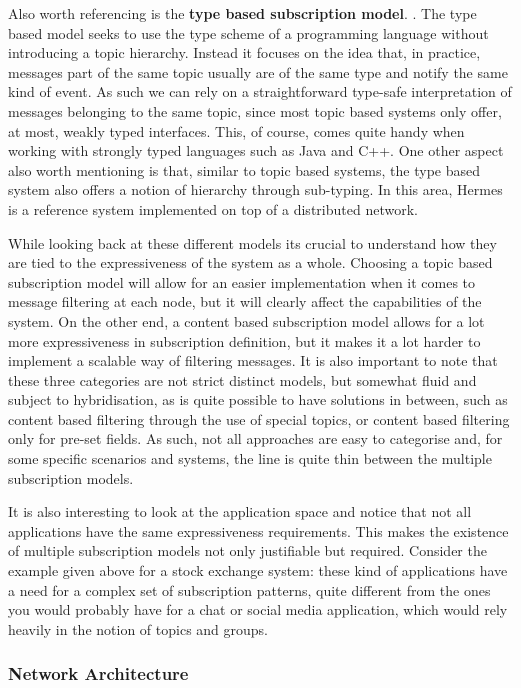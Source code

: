 Also worth referencing is the \textbf{type based subscription model}.
\cite{Eugster2000}. The type based model seeks to use the type
scheme of a programming language without introducing a topic hierarchy.
Instead it focuses on the idea that, in practice, messages part of the
same topic usually are of the same type and notify the same kind of
event. As such we can rely on a straightforward type-safe interpretation
of messages belonging to the same topic, since most topic based systems
only offer, at most, weakly typed interfaces. This, of course, comes
quite handy when working with strongly typed languages such as Java and
C++. One other aspect also worth mentioning is that, similar to topic
based systems, the type based system also offers a notion of hierarchy
through sub-typing. In this area, Hermes \cite{Pietzuch2002} is a
reference system implemented on top of a distributed network.

While looking back at these different models its crucial to understand
how they are tied to the expressiveness of the system as a whole.
Choosing a topic based subscription model will allow for an easier
implementation when it comes to message filtering at each node, but it
will clearly affect the capabilities of the system. On the other end, a
content based subscription model allows for a lot more expressiveness in
subscription definition, but it makes it a lot harder to implement a
scalable way of filtering messages. It is also important to note that
these three categories are not strict distinct models, but somewhat
fluid and subject to hybridisation, as is quite possible to have
solutions in between, such as content based filtering through the use of
special topics, or content based filtering only for pre-set fields. As
such, not all approaches are easy to categorise and, for some specific
scenarios and systems, the line is quite thin between the multiple
subscription models.

It is also interesting to look at the application space and notice that
not all applications have the same expressiveness requirements. This
makes the existence of multiple subscription models not only justifiable
but required. Consider the example given above for a stock exchange
system: these kind of applications have a need for a complex set of
subscription patterns, quite different from the ones you would probably
have for a chat or social media application, which would rely heavily in
the notion of topics and groups.

\subsubsection{Network Architecture}\label{network-architecture}

